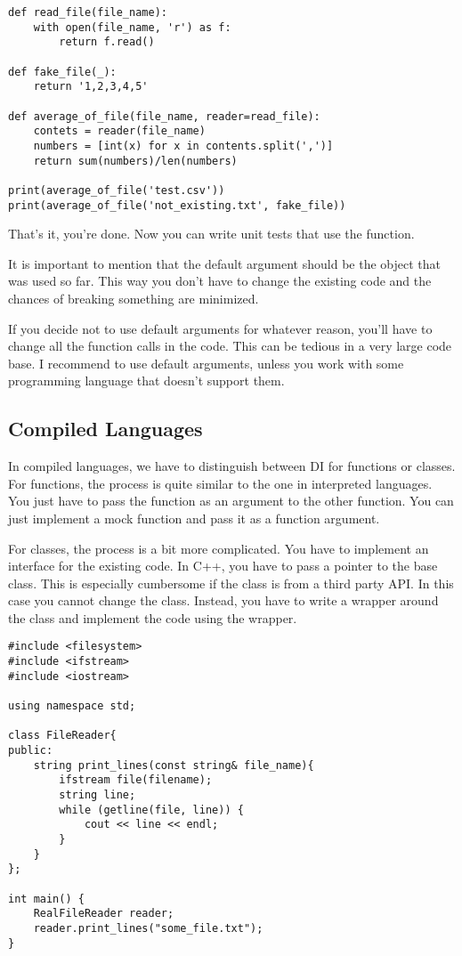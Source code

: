 \begin{programcode}{}
\begin{verbatim}
def read_file(file_name):
    with open(file_name, 'r') as f:
        return f.read()

def fake_file(_):
    return '1,2,3,4,5'

def average_of_file(file_name, reader=read_file):
    contets = reader(file_name)
    numbers = [int(x) for x in contents.split(',')]
    return sum(numbers)/len(numbers)

print(average_of_file('test.csv'))
print(average_of_file('not_existing.txt', fake_file))
\end{verbatim}
\end{programcode}

That's it, you're done. Now you can write unit tests that use the  function.

It is important to mention that the default argument should be the object that was used so far. This way you don't have to change the existing code and the chances of breaking something are minimized.

If you decide not to use default arguments for whatever reason, you'll have to change all the function calls in the code. This can be tedious in a very large code base. I recommend to use default arguments, unless you work with some programming language that doesn't support them.

\subsection{Compiled Languages}

In compiled languages, we have to distinguish between DI for functions or classes. For functions, the process is quite similar to the one in interpreted languages. You just have to pass the function as an argument to the other function. You can just implement a mock function and pass it as a function argument. 

For classes, the process is a bit more complicated. You have to implement an interface for the existing code. In C++, you have to pass a pointer to the base class. This is especially cumbersome if the class is from a third party API. In this case you cannot change the class. Instead, you have to write a wrapper around the class and implement the code using the wrapper.

\begin{programcode}{}
\begin{verbatim}
#include <filesystem>
#include <ifstream>
#include <iostream>

using namespace std; 

class FileReader{
public:
    string print_lines(const string& file_name){
        ifstream file(filename);
        string line;
        while (getline(file, line)) {
            cout << line << endl;
        }
    }
};

int main() {
    RealFileReader reader;
    reader.print_lines("some_file.txt");
}
\end{verbatim}
\end{programcode}

